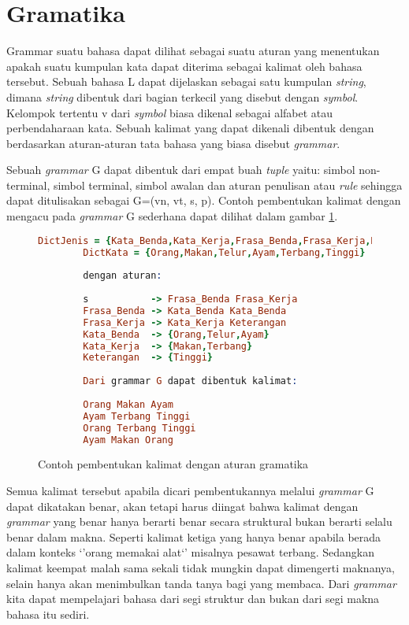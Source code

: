 \section{Gramatika}
Grammar suatu bahasa dapat dilihat sebagai suatu aturan yang menentukan apakah suatu kumpulan kata dapat diterima sebagai kalimat oleh bahasa tersebut. Sebuah bahasa L dapat dijelaskan sebagai satu kumpulan \emph{string}, dimana \emph{string} dibentuk dari bagian terkecil yang disebut dengan \emph{symbol}. Kelompok tertentu v dari \emph{symbol} biasa dikenal sebagai alfabet atau perbendaharaan kata. Sebuah kalimat yang dapat dikenali dibentuk dengan berdasarkan aturan-aturan tata bahasa yang biasa disebut \emph{grammar}.

Sebuah \emph{grammar} G dapat dibentuk dari empat buah \emph{tuple} yaitu: simbol non-terminal, simbol terminal, simbol awalan dan aturan penulisan atau \emph{rule} sehingga dapat ditulisakan sebagai G=(vn, vt, s, p). Contoh pembentukan kalimat dengan mengacu pada \emph{grammar} G sederhana dapat dilihat dalam gambar \ref{fig:pembentukan_grammar_g}.

\begin{figure}[ht]
	\centering
	\begin{lstlisting}[language=Prolog,xleftmargin=0pt]
		DictJenis = {Kata_Benda,Kata_Kerja,Frasa_Benda,Frasa_Kerja,Keterangan}
		DictKata = {Orang,Makan,Telur,Ayam,Terbang,Tinggi}
		
		dengan aturan:
	
		s           -> Frasa_Benda Frasa_Kerja
		Frasa_Benda -> Kata_Benda Kata_Benda
		Frasa_Kerja -> Kata_Kerja Keterangan
		Kata_Benda  -> {Orang,Telur,Ayam}
		Kata_Kerja  -> {Makan,Terbang}
		Keterangan  -> {Tinggi}
		
		Dari grammar G dapat dibentuk kalimat:
	
		Orang Makan Ayam
		Ayam Terbang Tinggi
		Orang Terbang Tinggi
		Ayam Makan Orang\end{lstlisting}
\caption{Contoh pembentukan kalimat dengan aturan gramatika}
\label{fig:pembentukan_grammar_g}
\end{figure}

Semua kalimat tersebut apabila dicari pembentukannya melalui \emph{grammar} G dapat dikatakan benar, akan tetapi harus diingat bahwa kalimat dengan \emph{grammar} yang benar hanya berarti benar secara struktural bukan berarti selalu benar dalam makna. Seperti kalimat ketiga yang hanya benar apabila berada dalam konteks `'orang memakai alat`' misalnya pesawat terbang. Sedangkan kalimat keempat malah sama sekali tidak mungkin dapat dimengerti maknanya, selain hanya akan menimbulkan tanda tanya bagi yang membaca. Dari \emph{grammar} kita dapat mempelajari bahasa dari segi struktur dan bukan dari segi makna bahasa itu sediri.

